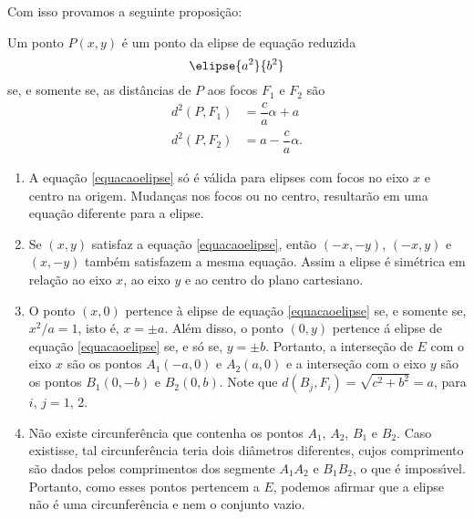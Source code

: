 Com isso provamos a seguinte proposi\c{c}\~ao:
\begin{proposicao}
  Um ponto $P(x,y)$ \'e um ponto da elipse de equa\c{c}\~ao reduzida
  \[
    \elipse{a^2}{b^2}
  \]
  se, e somente se, as dist\^ancias de $P$ aos focos $F_1$ e $F_2$ s\~ao
  \begin{align*}
    d^2(P,F_1) &= \dfrac{c}{a}\alpha + a\\
    d^2(P,F_2) &= a - \dfrac{c}{a}\alpha.
  \end{align*}
\end{proposicao}

\begin{observacao}
  \begin{enumerate}
    \item A equa\c{c}\~ao \eqref{equacaoelipse} s\'o \'e v\'alida para elipses com focos no eixo $x$ e centro na origem. Mudan\c{c}as nos focos ou no centro, resultar\~ao em uma equa\c{c}\~ao diferente para a elipse.
    \item Se $(x,y)$ satisfaz a equa\c{c}\~ao \eqref{equacaoelipse}, ent\~ao $(-x,-y)$, $(-x,y)$ e $(x,-y)$ tamb\'em satisfazem a mesma equa\c{c}\~ao. Assim a elipse \'e sim\'etrica em rela\c{c}\~ao ao eixo $x$, ao eixo $y$ e ao centro do plano cartesiano.
    \item O ponto $(x,0)$ pertence \`a elipse de equa\c{c}\~ao \eqref{equacaoelipse} se, e somente se, $x^2/a = 1$, isto \'e, $x = \pm a$. Al\'em disso, o ponto $(0,y)$ pertence \'a elipse de equa\c{c}\~ao \eqref{equacaoelipse} se, e s\'o se, $y = \pm b$. Portanto, a interse\c{c}\~ao de $E$ com o eixo $x$ s\~ao os pontos $A_1(-a,0)$ e $A_2(a,0)$ e a interse\c{c}\~ao com o eixo $y$ s\~ao os pontos $B_1(0,-b)$ e $B_2(0,b)$. Note que $d(B_j,F_i) = \sqrt{c^2 + b^2} = a$, para $i$, $j = 1$, 2.
    \item N\~ao existe circunfer\^encia que contenha os pontos $A_1$, $A_2$, $B_1$ e $B_2$. Caso existisse, tal circunfer\^encia teria dois di\^ametros diferentes, cujos comprimento s\~ao dados pelos comprimentos dos segmente $A_1A_2$ e $B_1B_2$, o que \'e imposs{\'\i}vel. Portanto, como esses pontos pertencem a $E$, podemos afirmar que a elipse n\~ao \'e uma circunfer\^encia e nem o conjunto vazio.
  \end{enumerate}
\end{observacao}

